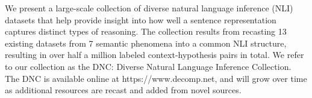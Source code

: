 We present a large-scale collection of diverse natural language inference (NLI) datasets that help provide insight into how well a sentence representation captures distinct types of reasoning. The collection results from recasting 13 existing datasets from 7 semantic phenomena into a common NLI structure, resulting in over half a million labeled context-hypothesis pairs in total. We refer to our collection as the DNC: Diverse Natural Language Inference Collection. The DNC is available online at https://www.decomp.net, and will grow over time as additional resources are recast and added from novel sources.
